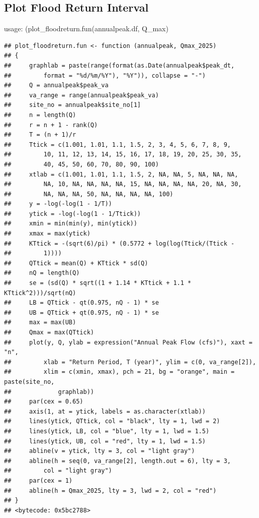 \documentclass{tufte-handout}\usepackage[]{graphicx}\usepackage[]{xcolor}
\makeatletter
\newenvironment{kframe}{%
 \def\at@end@of@kframe{}%
 \ifinner\ifhmode%
  \def\at@end@of@kframe{\end{minipage}}%
  \begin{minipage}{\columnwidth}%
 \fi\fi%
 \def\FrameCommand##1{\hskip\@totalleftmargin \hskip-\fboxsep
 \colorbox{shadecolor}{##1}\hskip-\fboxsep
     \hskip-\linewidth \hskip-\@totalleftmargin \hskip\columnwidth}%
 \MakeFramed {\advance\hsize-\width
   \@totalleftmargin\z@ \linewidth\hsize
   \@setminipage}}%
 {\par\unskip\endMakeFramed%
 \at@end@of@kframe}
\newenvironment{knitrout}{}{} %
\makeatother
\begin{document}
\subsection{Plot Flood Return Interval }


usage: (plot\_floodreturn.fun(annualpeak.df, Q\_max)



\begin{knitrout}
\color{fgcolor}\begin{kframe}
\begin{verbatim}
## plot_floodreturn.fun <- function (annualpeak, Qmax_2025) 
## {
##     graphlab = paste(range(format(as.Date(annualpeak$peak_dt, 
##         format = "%d/%m/%Y"), "%Y")), collapse = "-")
##     Q = annualpeak$peak_va
##     va_range = range(annualpeak$peak_va)
##     site_no = annualpeak$site_no[1]
##     n = length(Q)
##     r = n + 1 - rank(Q)
##     T = (n + 1)/r
##     Ttick = c(1.001, 1.01, 1.1, 1.5, 2, 3, 4, 5, 6, 7, 8, 9, 
##         10, 11, 12, 13, 14, 15, 16, 17, 18, 19, 20, 25, 30, 35, 
##         40, 45, 50, 60, 70, 80, 90, 100)
##     xtlab = c(1.001, 1.01, 1.1, 1.5, 2, NA, NA, 5, NA, NA, NA, 
##         NA, 10, NA, NA, NA, NA, 15, NA, NA, NA, NA, 20, NA, 30, 
##         NA, NA, NA, 50, NA, NA, NA, NA, 100)
##     y = -log(-log(1 - 1/T))
##     ytick = -log(-log(1 - 1/Ttick))
##     xmin = min(min(y), min(ytick))
##     xmax = max(ytick)
##     KTtick = -(sqrt(6)/pi) * (0.5772 + log(log(Ttick/(Ttick - 
##         1))))
##     QTtick = mean(Q) + KTtick * sd(Q)
##     nQ = length(Q)
##     se = (sd(Q) * sqrt((1 + 1.14 * KTtick + 1.1 * KTtick^2)))/sqrt(nQ)
##     LB = QTtick - qt(0.975, nQ - 1) * se
##     UB = QTtick + qt(0.975, nQ - 1) * se
##     max = max(UB)
##     Qmax = max(QTtick)
##     plot(y, Q, ylab = expression("Annual Peak Flow (cfs)"), xaxt = "n", 
##         xlab = "Return Period, T (year)", ylim = c(0, va_range[2]), 
##         xlim = c(xmin, xmax), pch = 21, bg = "orange", main = paste(site_no, 
##             graphlab))
##     par(cex = 0.65)
##     axis(1, at = ytick, labels = as.character(xtlab))
##     lines(ytick, QTtick, col = "black", lty = 1, lwd = 2)
##     lines(ytick, LB, col = "blue", lty = 1, lwd = 1.5)
##     lines(ytick, UB, col = "red", lty = 1, lwd = 1.5)
##     abline(v = ytick, lty = 3, col = "light gray")
##     abline(h = seq(0, va_range[2], length.out = 6), lty = 3, 
##         col = "light gray")
##     par(cex = 1)
##     abline(h = Qmax_2025, lty = 3, lwd = 2, col = "red")
## }
## <bytecode: 0x5bc2788>
\end{verbatim}
\end{kframe}
\end{knitrout}
\end{document}
